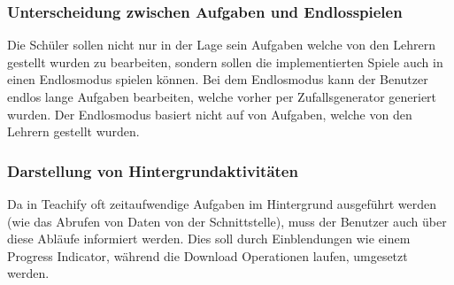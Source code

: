 \subsubsection{Unterscheidung zwischen Aufgaben und Endlosspielen}
Die Schüler sollen nicht nur in der Lage sein Aufgaben welche von den Lehrern gestellt wurden zu bearbeiten, sondern sollen die implementierten Spiele auch in einen Endlosmodus spielen können. Bei dem Endlosmodus kann der Benutzer endlos lange Aufgaben bearbeiten, welche vorher per Zufallsgenerator generiert wurden. Der Endlosmodus basiert nicht auf von Aufgaben, welche von den Lehrern gestellt wurden.

\subsubsection{Darstellung von Hintergrundaktivitäten}
Da in Teachify oft zeitaufwendige Aufgaben im Hintergrund ausgeführt werden (wie das Abrufen von Daten von der Schnittstelle), muss der Benutzer auch über diese Abläufe informiert werden. Dies soll durch Einblendungen wie einem Progress Indicator, während die Download Operationen laufen, umgesetzt werden.



